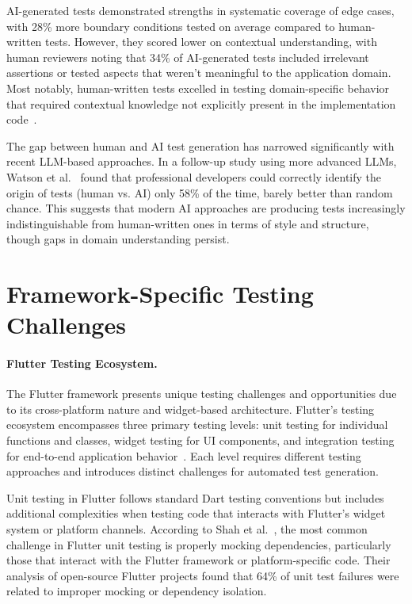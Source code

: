 \hspace{0.5cm} AI-generated tests demonstrated strengths in systematic coverage of edge cases, with 28\% more boundary conditions tested on average compared to human-written tests. However, they scored lower on contextual understanding, with human reviewers noting that 34\% of AI-generated tests included irrelevant assertions or tested aspects that weren't meaningful to the application domain. Most notably, human-written tests excelled in testing domain-specific behavior that required contextual knowledge not explicitly present in the implementation code~\cite{HumanVsAITests}.

\hspace{0.5cm} The gap between human and AI test generation has narrowed significantly with recent LLM-based approaches. In a follow-up study using more advanced LLMs, Watson et al.~\cite{TestBenchmark} found that professional developers could correctly identify the origin of tests (human vs. AI) only 58\% of the time, barely better than random chance. This suggests that modern AI approaches are producing tests increasingly indistinguishable from human-written ones in terms of style and structure, though gaps in domain understanding persist.

\section{Framework-Specific Testing Challenges}

\paragraph{Flutter Testing Ecosystem.} The Flutter framework presents unique testing challenges and opportunities due to its cross-platform nature and widget-based architecture. Flutter's testing ecosystem encompasses three primary testing levels: unit testing for individual functions and classes, widget testing for UI components, and integration testing for end-to-end application behavior~\cite{FlutterTesting}. Each level requires different testing approaches and introduces distinct challenges for automated test generation.

\hspace{0.5cm} Unit testing in Flutter follows standard Dart testing conventions but includes additional complexities when testing code that interacts with Flutter's widget system or platform channels. According to Shah et al.~\cite{FlutterUnitTesting}, the most common challenge in Flutter unit testing is properly mocking dependencies, particularly those that interact with the Flutter framework or platform-specific code. Their analysis of open-source Flutter projects found that 64\% of unit test failures were related to improper mocking or dependency isolation.

